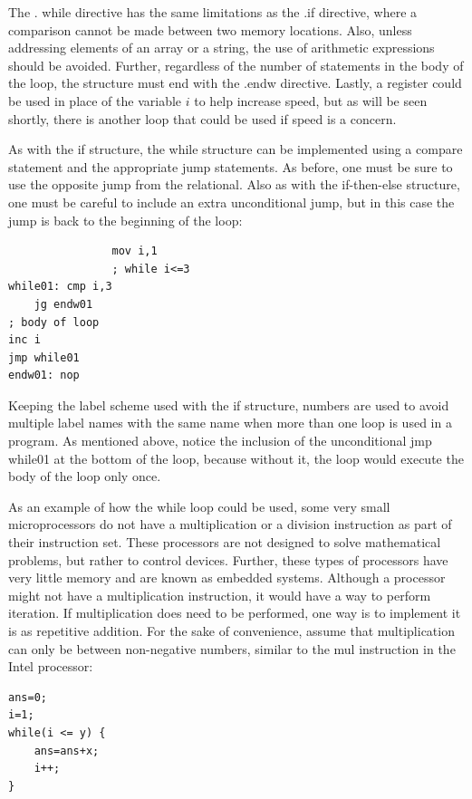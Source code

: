 \documentclass[10pt]{article}
\begin{document}
The . while directive has the same limitations as the .if directive, where a comparison cannot be made between two memory locations. Also, unless addressing elements of an array or a string, the use of arithmetic expressions should be avoided. Further, regardless of the number of statements in the body of the loop, the structure must end with the .endw directive. Lastly, a register could be used in place of the variable $i$ to help increase speed, but as will be seen shortly, there is another loop that could be used if speed is a concern.

As with the if structure, the while structure can be implemented using a compare statement and the appropriate jump statements. As before, one must be sure to use the opposite jump from the relational. Also as with the if-then-else structure, one must be careful to include an extra unconditional jump, but in this case the jump is back to the beginning of the loop:

\begin{verbatim}
                mov i,1
                ; while i<=3
while01: cmp i,3
    jg endw01
; body of loop
inc i
jmp while01
endw01: nop
\end{verbatim}

Keeping the label scheme used with the if structure, numbers are used to avoid multiple label names with the same name when more than one loop is used in a program. As mentioned above, notice the inclusion of the unconditional jmp while01 at the bottom of the loop, because without it, the loop would execute the body of the loop only once.

As an example of how the while loop could be used, some very small microprocessors do not have a multiplication or a division instruction as part of their instruction set. These processors are not designed to solve mathematical problems, but rather to control devices. Further, these types of processors have very little memory and are known as embedded systems. Although a processor might not have a multiplication instruction, it would have a way to perform iteration. If multiplication does need to be performed, one way is to implement it is as repetitive addition. For the sake of convenience, assume that multiplication can only be between non-negative numbers, similar to the mul instruction in the Intel processor:

\begin{verbatim}
ans=0;
i=1;
while(i <= y) {
    ans=ans+x;
    i++;
}
\end{verbatim}
\end{document}
